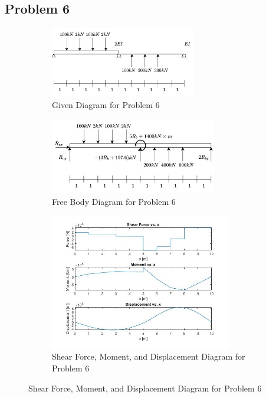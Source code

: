 \documentclass[a4paper]{article}
\begin{document}
\subsection{Problem 6}
\begin{figure}[H]
\centering
   \begin{subfigure}[b]{\textwidth}
   \centering
   \includegraphics[width=0.7\textwidth]{problems/prob_6.jpg}
   \caption{Given Diagram for Problem 6}
   \label{prob6:prob} 
\end{subfigure}
\begin{subfigure}[b]{\textwidth}
   \centering   
   \includegraphics[width=0.8\textwidth]{FBD/FBD_6_new.jpg}
   \caption{Free Body Diagram for Problem 6}
   \label{prob6:FBD}
\end{subfigure}
\begin{subfigure}[b]{\textwidth}
   \centering   
   \includegraphics[width=0.87\textwidth]{results/solution_6.jpg}
   \caption{Shear Force, Moment, and Displacement Diagram for Problem 6}
   \label{prob6:results}
\end{subfigure}
\label{prob6}
\end{figure}
\end{document}
